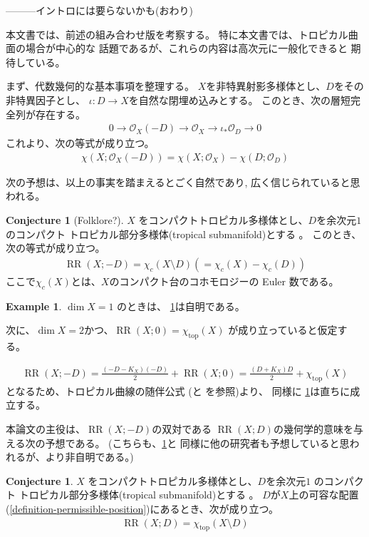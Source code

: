 \documentclass[a4paper,dvipdfmx,reqno,12pt]{amsart}
\theoremstyle{definition}
\newtheorem{example}[theorem]{Example}
\newtheorem{conjecture}[theorem]{Conjecture}
\newcommand{\opn}[1]{\operatorname{#1}}
\numberwithin{equation}{section}
\begin{document}
---------イントロには要らないかも(おわり)

本文書では、前述の組み合わせ版を考察する。
特に本文書では、トロピカル曲面の場合が中心的な
話題であるが、これらの内容は高次元に一般化できると
期待している。

まず、代数幾何的な基本事項を整理する。
$X$を非特異射影多様体とし、$D$をその非特異因子とし、
$\iota\colon D\to X$を自然な閉埋め込みとする。
このとき、次の層短完全列が存在する。
\begin{align}
     0\to \mathcal{O}_X(-D)\to 
\mathcal{O}_X\to \iota_*\mathcal{O}_D\to 0
\end{align}
これより、次の等式が成り立つ。
\begin{align}
\chi(X;\mathcal{O}_X(-D))=\chi(X;\mathcal{O}_X)
-\chi(D;\mathcal{O}_D)
\end{align}

次の予想は、以上の事実を踏まえるとごく自然であり,
広く信じられていると思われる。

\begin{conjecture}[{Folklore?}]
\label{conjecture-rr-c-euler}
$X$ をコンパクトトロピカル多様体とし、$D$を余次元$1$
のコンパクト
トロピカル部分多様体(tropical submanifold)とする
\cite[Definition 2.14]{demedrano2023chern}。
このとき、次の等式が成り立つ。
\begin{align}
\opn{RR}(X;-D)=
\chi_c (X\setminus D) (=\chi_c (X)-\chi_c(D))
\end{align}
ここで$\chi_c(X)$とは、$X$のコンパクト台のコホモロジーの
Euler 数である。

\end{conjecture}

\begin{example}
$\dim X=1$ のときは、
\cref{conjecture-rr-c-euler}は自明である。

次に、$\dim X=2$かつ、$\opn{RR}(X;0)=\chi_{\opn{top}}(X)$
が成り立っていると仮定する。

\begin{align}
\opn{RR}(X;-D)=\frac{(-D-K_X)(-D)}{2}+\opn{RR}(X;0)
=\frac{(D+K_X)D}{2}+\chi_{\opn{top}}(X)
\end{align}
となるため、トロピカル曲線の随伴公式
(\cite[Theorem 6]{shaw2015tropical}と
\cite[Theorem 5.2]{demedrano2023chern}を参照)より、
同様に \cref{conjecture-rr-c-euler}は直ちに成立する。
\end{example}
本論文の主役は、$\opn{RR}(X;-D)$の双対である
$\opn{RR}(X;D)$の幾何学的意味を与える次の予想である。
(こちらも、\cref{conjecture-rr-c-euler}と
同様に他の研究者も予想していると思われるが、より非自明である。)
\begin{conjecture}
\label{conjecture-rr-euler}
$X$ をコンパクトトロピカル多様体とし、$D$を余次元$1$
のコンパクト
トロピカル部分多様体(tropical submanifold)とする
\cite[Definition 2.14]{demedrano2023chern}。
$D$が$X$上の可容な配置
(\cref{definition-permissible-position})にあるとき、次が成り立つ。
\begin{align}
\opn{RR}(X;D)=\chi_{\opn{top}}(X\setminus D)
\end{align}
\end{conjecture}
\end{document}

